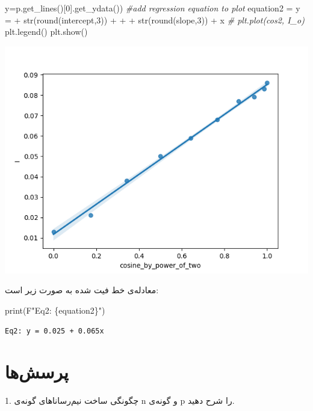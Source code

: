 \documentclass{article}
\newenvironment{Shaded}{}{}
\newcommand{\BuiltInTok}[1]{#1}
\newcommand{\CommentTok}[1]{\textcolor[rgb]{0.38,0.63,0.69}{\textit{#1}}}
\newcommand{\DecValTok}[1]{\textcolor[rgb]{0.25,0.63,0.44}{#1}}
\newcommand{\NormalTok}[1]{#1}
\newcommand{\OperatorTok}[1]{\textcolor[rgb]{0.40,0.40,0.40}{#1}}
\newcommand{\SpecialCharTok}[1]{\textcolor[rgb]{0.25,0.44,0.63}{#1}}
\newcommand{\SpecialStringTok}[1]{\textcolor[rgb]{0.73,0.40,0.53}{#1}}
\newcommand{\StringTok}[1]{\textcolor[rgb]{0.25,0.44,0.63}{#1}}
\begin{document}
\begin{latin}
\begin{Shaded}
\begin{Highlighting}[]
\NormalTok{                                                       y}\OperatorTok{=}\NormalTok{p.get\_lines()[}\DecValTok{0}\NormalTok{].get\_ydata())}
\CommentTok{\#add regression equation to plot}
\NormalTok{equation2 }\OperatorTok{=} \StringTok{\textquotesingle{}y = \textquotesingle{}} \OperatorTok{+} \BuiltInTok{str}\NormalTok{(}\BuiltInTok{round}\NormalTok{(intercept,}\DecValTok{3}\NormalTok{)) }\OperatorTok{+} \StringTok{\textquotesingle{} + \textquotesingle{}} \OperatorTok{+} \BuiltInTok{str}\NormalTok{(}\BuiltInTok{round}\NormalTok{(slope,}\DecValTok{3}\NormalTok{)) }\OperatorTok{+} \StringTok{\textquotesingle{}x\textquotesingle{}}
\CommentTok{\# plt.plot(cos2, I\_o)}
\NormalTok{plt.legend()}
\NormalTok{plt.show()}
\end{Highlighting}
\end{Shaded}
\begin{center}
\includegraphics[scale=0.80]{I-cos^2(theta) fig.png}
\end{center}
\end{latin}
معادله‌ی خط فیت شده به صورت زیر است:
\begin{latin}
\begin{Highlighting}
\BuiltInTok{print}\NormalTok{(}\SpecialStringTok{F"Eq2: }\SpecialCharTok{\{}\NormalTok{equation2}\SpecialCharTok{\}}\SpecialStringTok{"}\NormalTok{)}
\end{Highlighting}
\begin{verbatim}
Eq2: y = 0.025 + 0.065x
\end{verbatim}	
\end{latin}

\section{پرسش‌ها}
1. چگونگی ساخت نیم‌رسانا‌های گونه‌ی n و گونه‌ی p را شرح دهید.\\
\end{document}
